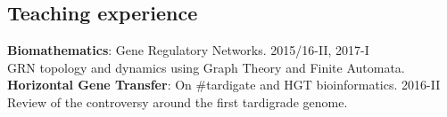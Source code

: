 \documentclass[margin,line]{res}
\begin{document}
\begin{resume}
\section{\sc Teaching experience}
{\bf Biomathematics}: Gene Regulatory Networks. \hfill {2015/16-II, 2017-I}\\ GRN topology and dynamics using Graph Theory and Finite Automata. \\[4pt] %
{\bf Horizontal Gene Transfer}: On \#tardigate and HGT bioinformatics. \hfill {2016-II}\\ 
Review of the controversy around the first tardigrade genome. \\








\end{resume}
\end{document}
